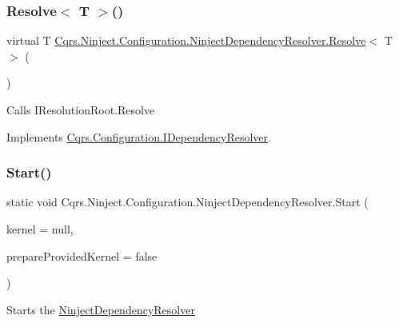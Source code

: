 \subsubsection{\texorpdfstring{Resolve$<$ T $>$()}{Resolve< T >()}}
{\footnotesize\ttfamily virtual T \hyperlink{classCqrs_1_1Ninject_1_1Configuration_1_1NinjectDependencyResolver_aef2a2be58a2562a349572e9946cd2930_aef2a2be58a2562a349572e9946cd2930}{Cqrs.\+Ninject.\+Configuration.\+Ninject\+Dependency\+Resolver.\+Resolve}$<$ T $>$ (\begin{DoxyParamCaption}{ }\end{DoxyParamCaption})\hspace{0.3cm}{\ttfamily [virtual]}}



Calls I\+Resolution\+Root.\+Resolve 



Implements \hyperlink{interfaceCqrs_1_1Configuration_1_1IDependencyResolver_a9dc7694a365209a5ef05270a7cfa7b6b_a9dc7694a365209a5ef05270a7cfa7b6b}{Cqrs.\+Configuration.\+I\+Dependency\+Resolver}.

\mbox{\label{classCqrs_1_1Ninject_1_1Configuration_1_1NinjectDependencyResolver_adc6171ed45679dcbaa67782770ba5083_adc6171ed45679dcbaa67782770ba5083}} 
\subsubsection{\texorpdfstring{Start()}{Start()}}
{\footnotesize\ttfamily static void Cqrs.\+Ninject.\+Configuration.\+Ninject\+Dependency\+Resolver.\+Start (\begin{DoxyParamCaption}\item[{I\+Kernel}]{kernel = {\ttfamily null},  }\item[{bool}]{prepare\+Provided\+Kernel = {\ttfamily false} }\end{DoxyParamCaption})\hspace{0.3cm}{\ttfamily [static]}}



Starts the \hyperlink{classCqrs_1_1Ninject_1_1Configuration_1_1NinjectDependencyResolver}{Ninject\+Dependency\+Resolver} 

